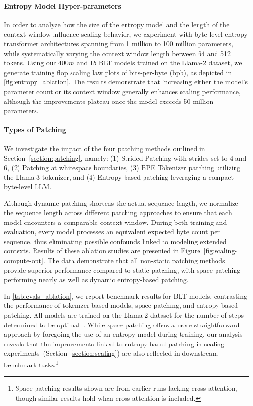 \paragraph{Entropy Model Hyper-parameters} In order to analyze how the size of the entropy model and the length of the context window influence scaling behavior, we experiment with byte-level entropy transformer architectures spanning from 1 million to 100 million parameters, while systematically varying the context window length between 64 and 512 tokens. Using our $400m$ and $1b$ {\textsc BLT} models trained on the Llama-2 dataset, we generate training flop scaling law plots of bits-per-byte (bpb), as depicted in \autoref{fig:entropy_ablation}. The results demonstrate that increasing either the model's parameter count or its context window generally enhances scaling performance, although the improvements plateau once the model exceeds 50 million parameters.

\paragraph{Types of Patching}

We investigate the impact of the four patching methods outlined in Section~\ref{section:patching}, namely: (1) Strided Patching with strides set to 4 and 6, (2) Patching at whitespace boundaries, (3) BPE Tokenizer patching utilizing the Llama 3 tokenizer, and (4) Entropy-based patching leveraging a compact byte-level LLM.

Although dynamic patching shortens the actual sequence length, we normalize the sequence length across different patching approaches to ensure that each model encounters a comparable context window. During both training and evaluation, every model processes an equivalent expected byte count per sequence, thus eliminating possible confounds linked to modeling extended contexts. Results of these ablation studies are presented in Figure~\ref{fig:scaling-compute-opt}. The data demonstrate that all non-static patching methods provide superior performance compared to static patching, with space patching performing nearly as well as dynamic entropy-based patching.

In \autoref{tab:evals_ablation}, we report benchmark results for {\textsc BLT} models, contrasting the performance of tokenizer-based models, space patching, and entropy-based patching. All models are trained on the Llama 2 dataset for the number of steps determined to be optimal~\citep{dubey2024llama}. While space patching offers a more straightforward approach by foregoing the use of an entropy model during training, our analysis reveals that the improvements linked to entropy-based patching in scaling experiments~(Section~\ref{section:scaling}) are also reflected in downstream benchmark tasks.\footnote{Space patching results shown are from earlier runs lacking cross-attention, though similar results hold when cross-attention is included.}

